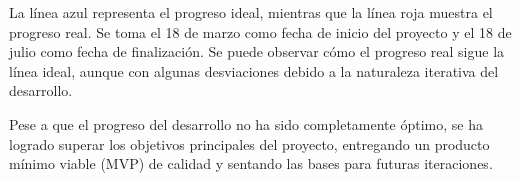 \newpage{}
La línea azul representa el progreso ideal, mientras que la línea roja muestra
el progreso real. Se toma el 18 de marzo como fecha de inicio del proyecto y el
18 de julio como fecha de finalización. Se puede observar cómo el progreso real
sigue la línea ideal, aunque con algunas desviaciones debido a la naturaleza
iterativa del desarrollo.

Pese a que el progreso del desarrollo no ha sido completamente óptimo, se ha
logrado superar los objetivos principales del proyecto, entregando un producto
mínimo viable (MVP) de calidad y sentando las bases para futuras iteraciones.

\newpage{}


\newpage{}


\newpage{}


\newpage{}

